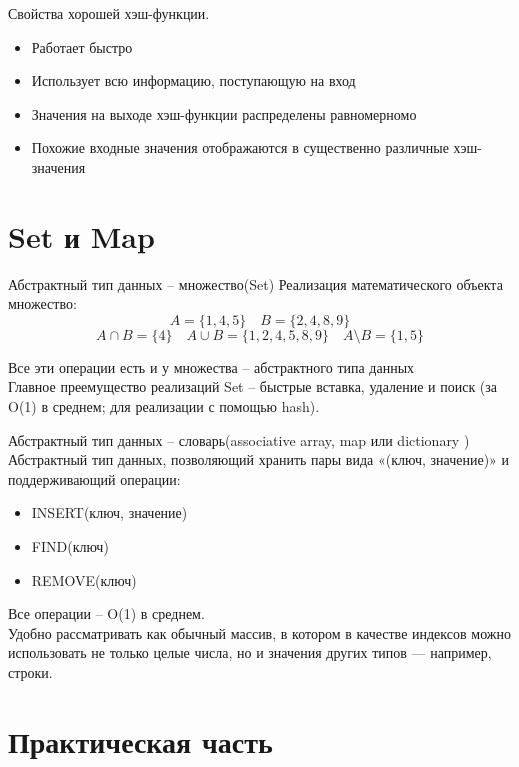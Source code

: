\documentclass[10pt]{beamer}
\begin{document}

\begin{frame}{Свойства хорошей хэш-функции.}
\begin{itemize}
\item Работает быстро
\item Использует всю информацию, поступающую на вход
\item Значения на выходе хэш-функции распределены равномерномо
\item Похожие входные значения отображаются в существенно различные хэш-значения
\end{itemize}
\end{frame}


\section{Set и Map}

\begin{frame}{Абстрактный тип данных -- множество(Set)}
Реализация математического объекта множество:
$$
A = \{1, 4, 5\} \quad B = \{2, 4, 8, 9\}
$$
$$
A \cap B = \{4\} \quad A \cup B = \{1, 2, 4, 5, 8, 9\} \quad A \setminus B = \{1, 5\}
$$

Все эти операции есть и у множества -- абстрактного типа данных \\
Главное преемущество реализаций Set -- быстрые вставка, удаление и поиск (за O(1) в среднем; для реализации с помощью hash).
\end{frame}



\begin{frame}{Абстрактный тип данных -- словарь(associative array, map или dictionary )}
Абстрактный тип данных, позволяющий хранить пары вида «(ключ, значение)» и поддерживающий операции:
\begin{itemize}
\item INSERT(ключ, значение)
\item FIND(ключ)
\item REMOVE(ключ)
\end{itemize}
Все операции -- O(1) в среднем. \\
Удобно рассматривать как обычный массив, в котором в качестве индексов можно использовать не только целые числа, но и значения других типов — например, строки.
\end{frame}



\section{Практическая часть}
\end{document}
